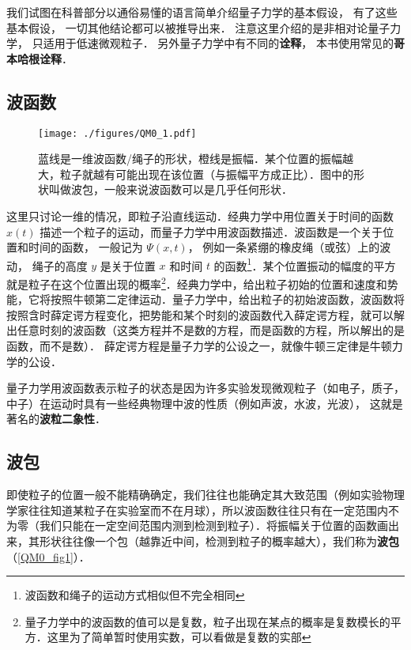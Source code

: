 

我们试图在科普部分以通俗易懂的语言简单介绍量子力学的基本假设， 有了这些基本假设， 一切其他结论都可以被推导出来． 注意这里介绍的是非相对论量子力学， 只适用于低速微观粒子． 另外量子力学中有不同的\textbf{诠释}， 本书使用常见的\textbf{哥本哈根诠释}．

\subsection{波函数}

\begin{figure}[ht]
\centering
\texttt{[image: ./figures/QM0\_1.pdf]}
\caption{蓝线是一维波函数/绳子的形状，橙线是振幅．某个位置的振幅越大，粒子就越有可能出现在该位置（与振幅平方成正比）．图中的形状叫做波包，一般来说波函数可以是几乎任何形状．} \label{QM0_fig1}
\end{figure}

这里只讨论一维的情况，即粒子沿直线运动．经典力学中用位置关于时间的函数 $x(t)$ 描述一个粒子的运动，而量子力学中用波函数描述．波函数是一个关于位置和时间的函数， 一般记为 $\Psi(x, t)$， 例如一条紧绷的橡皮绳（或弦）上的波动， 绳子的高度 $y$ 是关于位置 $x$ 和时间 $t$ 的函数\footnote{波函数和绳子的运动方式相似但不完全相同}．某个位置振动的幅度的平方就是粒子在这个位置出现的概率\footnote{量子力学中的波函数的值可以是复数，粒子出现在某点的概率是复数模长的平方．这里为了简单暂时使用实数，可以看做是复数的实部}．经典力学中，给出粒子初始的位置和速度和势能，它将按照牛顿第二定律运动．量子力学中，给出粒子的初始波函数，波函数将按照含时薛定谔方程变化，把势能和某个时刻的波函数代入薛定谔方程，就可以解出任意时刻的波函数（这类方程并不是数的方程，而是函数的方程，所以解出的是函数，而不是数）． 薛定谔方程是量子力学的公设之一，就像牛顿三定律是牛顿力学的公设．

量子力学用波函数表示粒子的状态是因为许多实验发现微观粒子（如电子，质子，中子）在运动时具有一些经典物理中波的性质（例如声波，水波，光波）， 这就是著名的\textbf{波粒二象性}．

\subsection{波包}
即使粒子的位置一般不能精确确定，我们往往也能确定其大致范围（例如实验物理学家往往知道某粒子在实验室而不在月球），所以波函数往往只有在一定范围内不为零（我们只能在一定空间范围内测到检测到粒子）．将振幅关于位置的函数画出来，其形状往往像一个包（越靠近中间，检测到粒子的概率越大），我们称为\textbf{波包}（\autoref{QM0_fig1}）．

